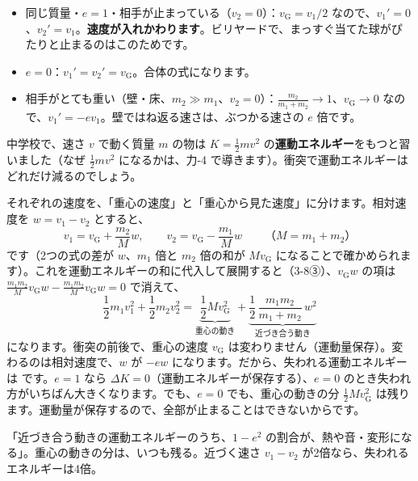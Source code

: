 \begin{itemize}[leftmargin=1.2\zw, itemsep=1pt, topsep=1pt, label={\color{bkTheme}●}]
\item 同じ質量・$e=1$・相手が止まっている（$v_2=0$）：$v_{\mathrm G}=v_1/2$ なので、$v_1'=0$、$v_2'=v_1$。\textbf{速度が入れかわります}。ビリヤードで、まっすぐ当てた球がぴたりと止まるのはこのためです。
\item $e=0$：$v_1'=v_2'=v_{\mathrm G}$。合体の式になります。
\item 相手がとても重い（壁・床、$m_2\gg m_1$、$v_2=0$）：$\tfrac{m_2}{m_1+m_2}\to1$、$v_{\mathrm G}\to0$ なので、$v_1'=-ev_1$。壁ではね返る速さは、ぶつかる速さの $e$ 倍です。
\end{itemize}

\label{ph:力-3:sonshitsu}中学校で、速さ $v$ で動く質量 $m$ の物は $K=\tfrac{1}{2}mv^2$ の\textbf{運動エネルギー}をもつと習いました（なぜ $\tfrac{1}{2}mv^2$ になるかは、力-4 で導きます）。衝突で運動エネルギーはどれだけ減るのでしょう。

それぞれの速度を、「重心の速度」と「重心から見た速度」に分けます。相対速度を $w=v_1-v_2$ とすると、
\[v_1=v_{\mathrm G}+\frac{m_2}{M}w,\qquad v_2=v_{\mathrm G}-\frac{m_1}{M}w\qquad（M=m_1+m_2）\]
です（2つの式の差が $w$、$m_1$ 倍と $m_2$ 倍の和が $Mv_{\mathrm G}$ になることで確かめられます）。これを運動エネルギーの和に代入して展開すると（\mbox{3-8③}）、$v_{\mathrm G}w$ の項は $\tfrac{m_1m_2}{M}v_{\mathrm G}w-\tfrac{m_1m_2}{M}v_{\mathrm G}w=0$ で消えて、
\[\frac{1}{2}m_1v_1^2+\frac{1}{2}m_2v_2^2=\underbrace{\frac{1}{2}Mv_{\mathrm G}^2}_{\text{重心の動き}}+\underbrace{\frac{1}{2}\,\frac{m_1m_2}{m_1+m_2}\,w^2}_{\text{近づき合う動き}}\]
になります。衝突の前後で、重心の速度 $v_{\mathrm G}$ は変わりません（運動量保存）。変わるのは相対速度で、$w$ が $-ew$ になります。だから、失われる運動エネルギーは
です。$e=1$ なら $\Delta K=0$（運動エネルギーが保存する）、$e=0$ のとき失われ方がいちばん大きくなります。でも、$e=0$ でも、重心の動きの分 $\tfrac{1}{2}Mv_{\mathrm G}^2$ は残ります。運動量が保存するので、全部が止まることはできないからです。

\begin{phyomi}[$\Delta K=\dfrac{1}{2}\,\dfrac{m_1m_2}{m_1+m_2}\,(1-e^2)(v_1-v_2)^2$]
「近づき合う動きの運動エネルギーのうち、$1-e^2$ の割合が、熱や音・変形になる」。重心の動きの分は、いつも残る。近づく速さ $v_1-v_2$ が2倍なら、失われるエネルギーは4倍。
\end{phyomi}


